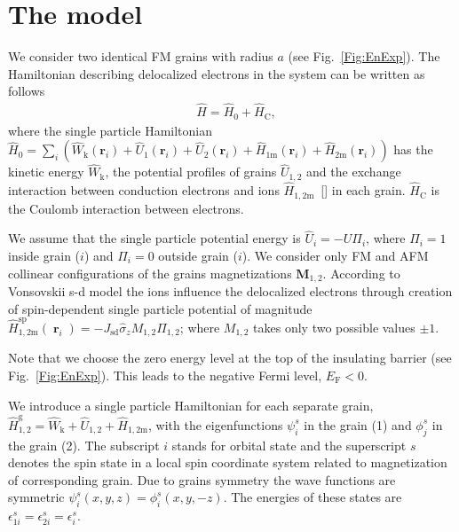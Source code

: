 \documentclass[aps,prb,amsmath,amssymb,twocolumn,superscriptaddress,showpacs,floatfix]{revtex4-1}
\DeclareMathOperator{\rv}{\mathbf r}
\begin{document}
\section{The model}\label{Sec:model}

We consider two identical FM grains with radius $a$ (see Fig.~\ref{Fig:EnExp}).
The Hamiltonian describing delocalized electrons in the system can be written as follows
\begin{equation}\label{Eq:HamIn}
\begin{split}
&\hat H=\hat H_0+\hat H_\mathrm C,
\end{split}
\end{equation}
where the single particle Hamiltonian $\hat H_0=\sum_i (\hat W_\mathrm k(\mathbf r_i)+\hat U_1(\mathbf r_i)+\hat U_2(\mathbf r_i)+\hat H_{1\mathrm{m}}(\mathbf r_i)+\hat H_{2\mathrm{m}}(\mathbf r_i))$ has the kinetic energy $\hat W_\mathrm k$, the
potential profiles of grains $\hat U_{1,2}$ and the exchange interaction between conduction electrons and ions $\hat H_{1,2\mathrm{m}}$~[] in each grain. $\hat H_{\mathrm{C}}$ is the Coulomb interaction between electrons.

We assume that the single particle potential energy is $\hat U_{i}=-U\Pi_i$, where $\Pi_{i}=1$ inside grain ($i$) and $\Pi_{i}=0$ outside grain ($i$). We consider only
FM and AFM collinear configurations of the grains magnetizations $\mathbf{M}_{1,2}$. According to Vonsovskii s-d model the ions influence the delocalized electrons through creation of spin-dependent single particle potential of magnitude $\hat H_{1,2\mathrm{m}}^\mathrm{sp}(\rv_i)=-J_\mathrm{sd}\hat \sigma_z M_{1,2}\Pi_{1,2}$; where
$M_{1,2}$ takes only two possible values $\pm 1$.

Note that we choose the zero energy level at the top of the insulating barrier
(see Fig.~\ref{Fig:EnExp}). This leads to the negative Fermi level, $E_\mathrm F<0$.

We introduce a single particle Hamiltonian for each separate grain,
$\hat H^{\mathrm{g}}_{1,2}=\hat W_\mathrm k+\hat U_{1,2}+\hat H_{1,2\mathrm{m}}$,
with the eigenfunctions $\psi^s_i$ in the grain (1) and $\phi^s_j$ in the grain (2). The subscript $i$ stands for orbital state and the superscript $s$ denotes the spin state in a local spin coordinate system related to magnetization of corresponding grain.
Due to grains symmetry the wave functions are symmetric $\psi^s_i(x,y,z)=\phi^s_i(x,y,-z)$. The
energies of these states are $\epsilon_{1i}^s=\epsilon_{2i}^s=\epsilon_i^s$.
\end{document}
